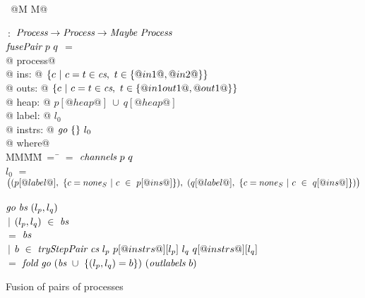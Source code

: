 
\begin{figure}

\begin{tabbing}
~@M M@   \TABDEF \kill

 \> $~:$ \> $\textit{Process} \to \textit{Process} \to  \textit{Maybe}~\textit{Process}$ \\
$\textit{fusePair}~p~q$ \> $=$ \\
@    process@ \\
@        ins: @ $\{ c~|~c=t \in \textit{cs},~t \in \{ @in1@,@in2@ \} \} $ \\
@       outs: @ $\{ c~|~c=t \in \textit{cs},~t \in \{ @in1out1@,@out1@ \} \} $ \\
@       heap: @ $p[@heap@]~\cup~q[@heap@]$ \\
@      label: @ $l_0$ \\
@     instrs: @ $\textit{go}~\{  \}~l_0$ \\
@ where@ \\
MM\=MM\=~=~\=\kill
 \> \cs \> $=$ \> $\textit{channels}~p~q$ \\
 \> $l_0$   \> $=$ \> $
      \big( 
      (p[@label@],~\{ c=none_S~|~c~\in~p[@ins@] \}),~
      (q[@label@],~\{ c=none_S~|~c~\in~q[@ins@] \})
      \big)$ \\
 \\
 \> $\textit{go}~\textit{bs}~(l_p,l_q)$ \\
 \> \> $~|$ \> $(l_p,l_q)~\in~\textit{bs}$ \\
 \> \> $=$  \> $\textit{bs}$ \\
 \> \> $~|$ \>
        $b~\in~\textit{tryStepPair}~\textit{cs}~l_p~p[@instrs@][l_p]~l_q~q[@instrs@][l_q]$ \\ 
 \> \> $=$ \> $\textit{fold}~\textit{go}~(\textit{bs}~\cup~\{ (l_p,l_q)=b \})~(\textit{outlabels}~b)$
\end{tabbing}

\caption{Fusion of pairs of processes}


\label{fig:Fusion:Def:Top}
\end{figure}



